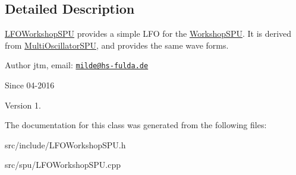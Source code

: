 \subsection{Detailed Description}
\hyperlink{classLFOWorkshopSPU}{L\-F\-O\-Workshop\-S\-P\-U} provides a simple L\-F\-O for the \hyperlink{classWorkshopSPU}{Workshop\-S\-P\-U}. It is derived from \hyperlink{classMultiOscillatorSPU}{Multi\-Oscillator\-S\-P\-U}, and provides the same wave forms.

\begin{DoxyAuthor}{Author}
jtm, email\-:  \href{mailto:milde@hs-fulda.de}{\tt milde@hs-\/fulda.\-de} 
\end{DoxyAuthor}
\begin{DoxySince}{Since}
04-\/2016 
\end{DoxySince}
\begin{DoxyVersion}{Version}
1. 
\end{DoxyVersion}


The documentation for this class was generated from the following files\-:\begin{DoxyCompactItemize}
\item 
src/include/L\-F\-O\-Workshop\-S\-P\-U.\-h\item 
src/spu/L\-F\-O\-Workshop\-S\-P\-U.\-cpp\end{DoxyCompactItemize}
